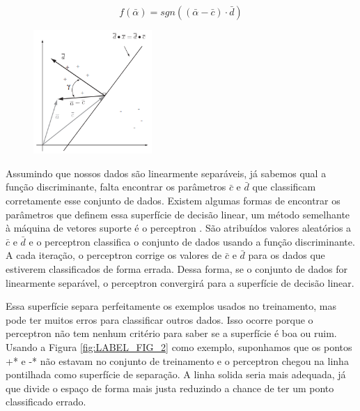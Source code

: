 \begin{equation}
f(\bar{\alpha})=sgn((\bar{\alpha}-\bar{c})\cdot\bar{d})
    \label{eq:LABEL_EQ_1}
\end{equation}

\begin{figure}
  \centering
  \includegraphics[width=0.4\textwidth]{imagens/svm_1.png}
  \label{fig:LABEL_FIG_1}
\end{figure}

Assumindo que nossos dados são linearmente separáveis, já sabemos qual a função discriminante, falta encontrar os parâmetros $\bar{c}$ e $\bar{d}$ que classificam corretamente esse conjunto de dados. Existem algumas formas de encontrar os parâmetros que definem essa superfície de decisão linear, um método semelhante à máquina de vetores suporte é o perceptron \cite{art:LIVRO_SVM}. São atribuídos valores aleatórios a $\bar{c}$ e $\bar{d}$ e o perceptron classifica o conjunto de dados usando a função discriminante. A cada iteração, o perceptron corrige os valores de $\bar{c}$ e $\bar{d}$ para os dados que estiverem classificados de forma errada. Dessa forma, se o conjunto de dados for linearmente separável, o perceptron convergirá para a superfície de decisão linear.

Essa superfície separa perfeitamente os exemplos usados no treinamento, mas pode ter muitos erros para classificar outros dados. Isso ocorre porque o perceptron não tem nenhum critério para saber se a superfície é boa ou ruim. Usando a Figura \ref{fig:LABEL_FIG_2} como exemplo, suponhamos que os pontos +* e -* não estavam no conjunto de treinamento e o perceptron chegou na linha pontilhada como superfície de separação. A linha solida seria mais adequada, já que divide o espaço de forma mais justa reduzindo a chance de ter um ponto classificado errado.

